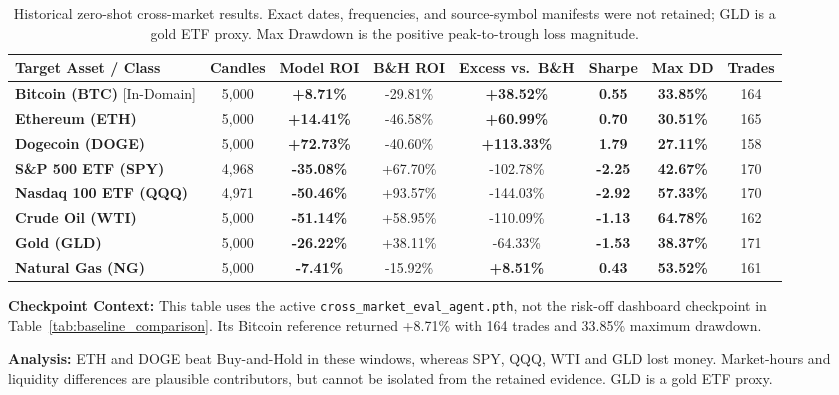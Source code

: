 \documentclass[11pt,a4paper]{article}
\begin{document}
\begin{table}[H]
\centering
\footnotesize
\setlength{\tabcolsep}{3.8pt}
\begin{tabularx}{\textwidth}{l c c c c c c c}
\toprule
\textbf{Target Asset / Class} & \textbf{Candles} & \textbf{Model ROI} & \textbf{B\&H ROI} & \textbf{Excess vs.\ B\&H} & \textbf{Sharpe} & \textbf{Max DD} & \textbf{Trades} \\
\midrule
\textbf{Bitcoin (BTC)} [In-Domain] & 5,000 & \textbf{+8.71\%} & -29.81\% & \textbf{+38.52\%} & \textbf{0.55} & \textbf{33.85\%} & 164 \\
\textbf{Ethereum (ETH)} & 5,000 & \textbf{+14.41\%} & -46.58\% & \textbf{+60.99\%} & \textbf{0.70} & \textbf{30.51\%} & 165 \\
\textbf{Dogecoin (DOGE)} & 5,000 & \textbf{+72.73\%} & -40.60\% & \textbf{+113.33\%} & \textbf{1.79} & \textbf{27.11\%} & 158 \\
\textbf{S\&P 500 ETF (SPY)} & 4,968 & \textbf{-35.08\%} & +67.70\% & -102.78\% & \textbf{-2.25} & \textbf{42.67\%} & 170 \\
\textbf{Nasdaq 100 ETF (QQQ)} & 4,971 & \textbf{-50.46\%} & +93.57\% & -144.03\% & \textbf{-2.92} & \textbf{57.33\%} & 170 \\
\textbf{Crude Oil (WTI)} & 5,000 & \textbf{-51.14\%} & +58.95\% & -110.09\% & \textbf{-1.13} & \textbf{64.78\%} & 162 \\
\textbf{Gold (GLD)} & 5,000 & \textbf{-26.22\%} & +38.11\% & -64.33\% & \textbf{-1.53} & \textbf{38.37\%} & 171 \\
\textbf{Natural Gas (NG)} & 5,000 & \textbf{-7.41\%} & -15.92\% & \textbf{+8.51\%} & \textbf{0.43} & \textbf{53.52\%} & 161 \\
\bottomrule
\end{tabularx}
\caption{Historical zero-shot cross-market results. Exact dates, frequencies, and source-symbol manifests were not retained; GLD is a gold ETF proxy. Max Drawdown is the positive peak-to-trough loss magnitude.}
\label{tab:cross_market}
\end{table}

\textbf{Checkpoint Context:}
This table uses the active \texttt{cross\_market\_eval\_agent.pth}, not the risk-off dashboard checkpoint in Table~\ref{tab:baseline_comparison}. Its Bitcoin reference returned +8.71\% with 164 trades and 33.85\% maximum drawdown.

\textbf{Analysis:} ETH and DOGE beat Buy-and-Hold in these windows, whereas SPY, QQQ, WTI and GLD lost money. Market-hours and liquidity differences are plausible contributors, but cannot be isolated from the retained evidence. GLD is a gold ETF proxy.
\end{document}

